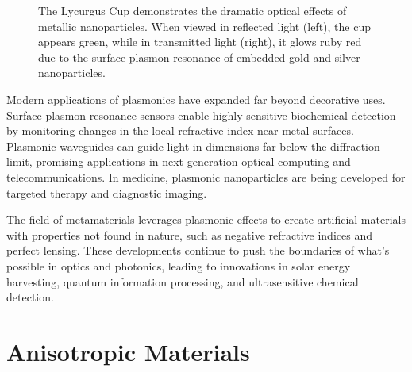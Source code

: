 \documentclass[
  a4paper,
]{book}
\begin{document}
\begin{figure}


\caption{\label{fig-lycurgus}The Lycurgus Cup demonstrates the dramatic
optical effects of metallic nanoparticles. When viewed in reflected
light (left), the cup appears green, while in transmitted light (right),
it glows ruby red due to the surface plasmon resonance of embedded gold
and silver nanoparticles.}

\end{figure}%

Modern applications of plasmonics have expanded far beyond decorative
uses. Surface plasmon resonance sensors enable highly sensitive
biochemical detection by monitoring changes in the local refractive
index near metal surfaces. Plasmonic waveguides can guide light in
dimensions far below the diffraction limit, promising applications in
next-generation optical computing and telecommunications. In medicine,
plasmonic nanoparticles are being developed for targeted therapy and
diagnostic imaging.

The field of metamaterials leverages plasmonic effects to create
artificial materials with properties not found in nature, such as
negative refractive indices and perfect lensing. These developments
continue to push the boundaries of what's possible in optics and
photonics, leading to innovations in solar energy harvesting, quantum
information processing, and ultrasensitive chemical detection.

\chapter{Anisotropic Materials}\label{anisotropic-materials}
\end{document}
